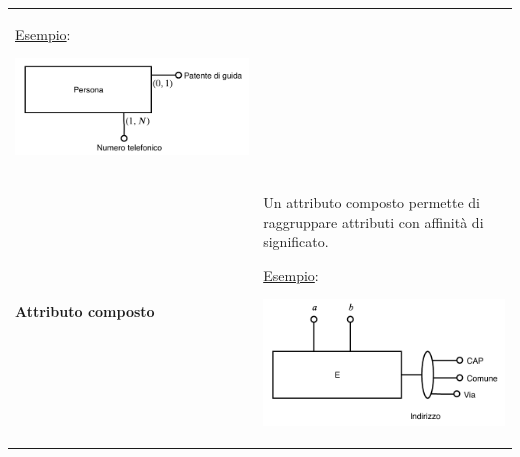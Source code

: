 \documentclass[a4paper, 10pt]{report}
\begin{document}
\begin{longtable}{| p{} | p{} |}
\underline{Esempio}:

\begin{center}
\includegraphics[scale=0.5]{15ottobre07.pdf}
\end{center}
\\
\textbf{Attributo composto} & Un attributo composto permette di raggruppare attributi con affinità di significato.

\underline{Esempio}:

\begin{center}
\includegraphics[scale=0.5]{15ottobre06.pdf}
\end{center}

\end{longtable}
\end{document}
